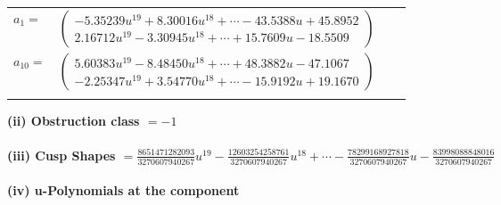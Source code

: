 \documentclass[1p]{elsarticle_modified}
\theoremstyle{definition}
\begin{document}
\begin{tabular}{m{7pt} m{180pt} m{7pt} m{180pt} }
\flushright $a_{1}=$&$\begin{pmatrix}-5.35239 u^{19}+8.30016 u^{18}+\cdots-43.5388 u+45.8952\\2.16712 u^{19}-3.30945 u^{18}+\cdots+15.7609 u-18.5509\end{pmatrix}$ \\
\flushright $a_{10}=$&$\begin{pmatrix}5.60383 u^{19}-8.48450 u^{18}+\cdots+48.3882 u-47.1067\\-2.25347 u^{19}+3.54770 u^{18}+\cdots-15.9192 u+19.1670\end{pmatrix}$\\&\end{tabular}
\flushleft \textbf{(ii) Obstruction class $= -1$}\\~\\
\flushleft \textbf{(iii) Cusp Shapes $= \frac{8651471282093}{3270607940267} u^{19}-\frac{12603254258761}{3270607940267} u^{18}+\cdots-\frac{78299168927818}{3270607940267} u-\frac{83998088848016}{3270607940267}$}\\~\\
\newpage\renewcommand{\arraystretch}{1}
\flushleft \textbf{(iv) u-Polynomials at the component}\newline \\
\end{document}
